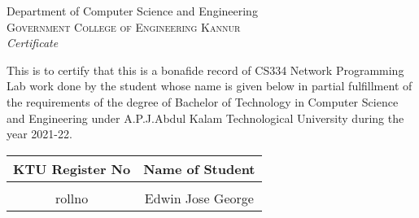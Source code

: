 \newpage
\thispagestyle{empty}
\vspace*{\fill}
\begin{onehalfspace}
\begin{center}

	\huge{Department of Computer Science and Engineering}\\[0.5cm]
	\normalsize \textsc{Government College of Engineering Kannur}\\[2.0cm]

	\emph{\LARGE Certificate}\\[1.0cm]
\end{center}

\normalsize This is to certify that this is a bonafide record of CS334 Network Programming Lab work done by the student whose name is given below in partial fulfillment of the requirements of the degree of Bachelor of Technology in Computer Science and Engineering under A.P.J.Abdul Kalam Technological University during the year 2021-22.\\[1.0cm]

\begin{table}[h]
	\centering
	\begin{tabular}{cc}
		KTU Register No & Name of Student
		\\ \hline \\
		rollno      & Edwin Jose George
	\end{tabular}
\end{table}
\vspace{2cm}


\begin{table}[h]
	\centering
\end{table}
\end{onehalfspace}
\vspace*{\fill}
